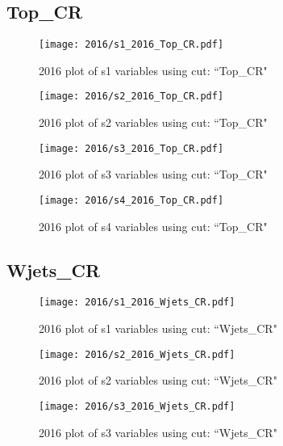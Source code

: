 \documentclass{article}
\begin{document}
      \subsection*{Top\_CR}
                        \begin{figure}[H]
                            \centering
                            \caption{2016 plot of s1 variables using cut: ``Top\_CR"}
                            \texttt{[image: 2016/s1\_2016\_Top\_CR.pdf]}
                        \end{figure}    
                        \begin{figure}[H]
                            \centering
                            \caption{2016 plot of s2 variables using cut: ``Top\_CR"}
                            \texttt{[image: 2016/s2\_2016\_Top\_CR.pdf]}
                        \end{figure}    
                        \begin{figure}[H]
                            \centering
                            \caption{2016 plot of s3 variables using cut: ``Top\_CR"}
                            \texttt{[image: 2016/s3\_2016\_Top\_CR.pdf]}
                        \end{figure}    
                        \begin{figure}[H]
                            \centering
                            \caption{2016 plot of s4 variables using cut: ``Top\_CR"}
                            \texttt{[image: 2016/s4\_2016\_Top\_CR.pdf]}
                        \end{figure}    
      \subsection*{Wjets\_CR}
                        \begin{figure}[H]
                            \centering
                            \caption{2016 plot of s1 variables using cut: ``Wjets\_CR"}
                            \texttt{[image: 2016/s1\_2016\_Wjets\_CR.pdf]}
                        \end{figure}    
                        \begin{figure}[H]
                            \centering
                            \caption{2016 plot of s2 variables using cut: ``Wjets\_CR"}
                            \texttt{[image: 2016/s2\_2016\_Wjets\_CR.pdf]}
                        \end{figure}    
                        \begin{figure}[H]
                            \centering
                            \caption{2016 plot of s3 variables using cut: ``Wjets\_CR"}
                            \texttt{[image: 2016/s3\_2016\_Wjets\_CR.pdf]}
                        \end{figure}    
\end{document}
